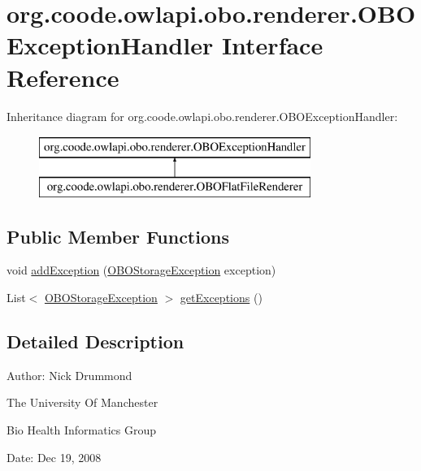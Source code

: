 \hypertarget{interfaceorg_1_1coode_1_1owlapi_1_1obo_1_1renderer_1_1_o_b_o_exception_handler}{\section{org.\-coode.\-owlapi.\-obo.\-renderer.\-O\-B\-O\-Exception\-Handler Interface Reference}
\label{interfaceorg_1_1coode_1_1owlapi_1_1obo_1_1renderer_1_1_o_b_o_exception_handler}
}
Inheritance diagram for org.\-coode.\-owlapi.\-obo.\-renderer.\-O\-B\-O\-Exception\-Handler\-:\begin{figure}[H]
\begin{center}
\leavevmode
\includegraphics[height=2.000000cm]{interfaceorg_1_1coode_1_1owlapi_1_1obo_1_1renderer_1_1_o_b_o_exception_handler}
\end{center}
\end{figure}
\subsection*{Public Member Functions}
\begin{DoxyCompactItemize}
\item 
void \hyperlink{interfaceorg_1_1coode_1_1owlapi_1_1obo_1_1renderer_1_1_o_b_o_exception_handler_a457bfcfa0d28158754b66d653228d5aa}{add\-Exception} (\hyperlink{classorg_1_1coode_1_1owlapi_1_1obo_1_1renderer_1_1_o_b_o_storage_exception}{O\-B\-O\-Storage\-Exception} exception)
\item 
List$<$ \hyperlink{classorg_1_1coode_1_1owlapi_1_1obo_1_1renderer_1_1_o_b_o_storage_exception}{O\-B\-O\-Storage\-Exception} $>$ \hyperlink{interfaceorg_1_1coode_1_1owlapi_1_1obo_1_1renderer_1_1_o_b_o_exception_handler_a812ae5f8bd3f91489abd9afe90a0f0d9}{get\-Exceptions} ()
\end{DoxyCompactItemize}


\subsection{Detailed Description}
Author\-: Nick Drummond\par
 The University Of Manchester\par
 Bio Health Informatics Group\par
 Date\-: Dec 19, 2008\par
\par
 

